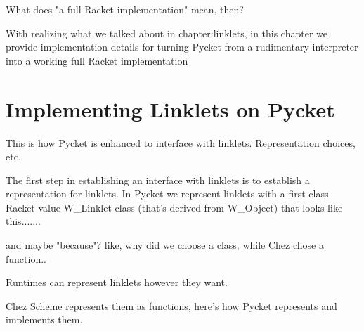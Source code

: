 	\begin{paragraph-here}%
		What does "a full Racket implementation" mean, then?
	\end{paragraph-here}

	\begin{paragraph-here}%
		With realizing what we talked about in chapter:linklets, in this chapter we provide implementation details for turning Pycket from a rudimentary interpreter into a working full Racket implementation
	\end{paragraph-here}

	\section[\texorpdfstring{Implementing Linklets on Pycket}{Linklets on Pycket}]{Implementing Linklets on Pycket}

		\begin{mainpoint}
			This is how Pycket is enhanced to interface with linklets. Representation choices, etc.
		\end{mainpoint}

		\begin{paragraph-here}%
			The first step in establishing an interface with linklets is to establish a representation for linklets. In Pycket we represent linklets with a first-class Racket value W\_Linklet class (that's derived from W\_Object) that looks like this.......

			and maybe "because"? like, why did we choose a class, while Chez chose a function..

			Runtimes can represent linklets however they want.

		Chez Scheme represents them as functions, here's how Pycket represents and implements them.
		\end{paragraph-here}

